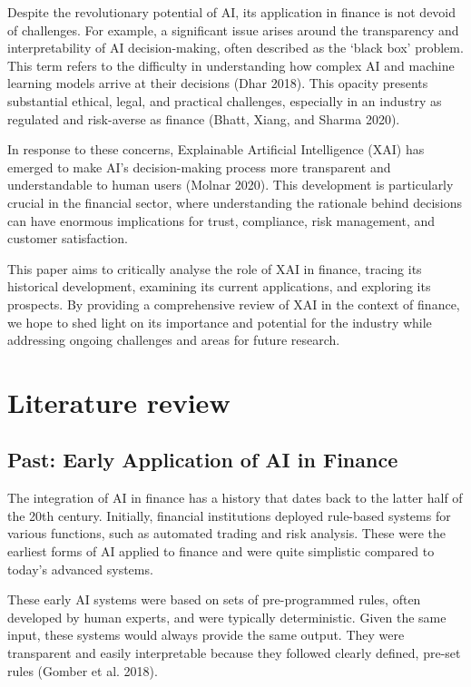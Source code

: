 \documentclass[
  letterpaper,
  DIV=11,
  numbers=noendperiod]{scrartcl}
\begin{document}
Despite the revolutionary potential of AI, its application in finance is
not devoid of challenges. For example, a significant issue arises around
the transparency and interpretability of AI decision-making, often
described as the `black box' problem. This term refers to the difficulty
in understanding how complex AI and machine learning models arrive at
their decisions (Dhar 2018). This opacity presents substantial ethical,
legal, and practical challenges, especially in an industry as regulated
and risk-averse as finance (Bhatt, Xiang, and Sharma 2020).

In response to these concerns, Explainable Artificial Intelligence (XAI)
has emerged to make AI's decision-making process more transparent and
understandable to human users (Molnar 2020). This development is
particularly crucial in the financial sector, where understanding the
rationale behind decisions can have enormous implications for trust,
compliance, risk management, and customer satisfaction.

This paper aims to critically analyse the role of XAI in finance,
tracing its historical development, examining its current applications,
and exploring its prospects. By providing a comprehensive review of XAI
in the context of finance, we hope to shed light on its importance and
potential for the industry while addressing ongoing challenges and areas
for future research.

\hypertarget{literature-review}{%
\section{Literature review}\label{literature-review}}

\hypertarget{past-early-application-of-ai-in-finance}{%
\subsection{Past: Early Application of AI in
Finance}\label{past-early-application-of-ai-in-finance}}

The integration of AI in finance has a history that dates back to the
latter half of the 20th century. Initially, financial institutions
deployed rule-based systems for various functions, such as automated
trading and risk analysis. These were the earliest forms of AI applied
to finance and were quite simplistic compared to today's advanced
systems.

These early AI systems were based on sets of pre-programmed rules, often
developed by human experts, and were typically deterministic. Given the
same input, these systems would always provide the same output. They
were transparent and easily interpretable because they followed clearly
defined, pre-set rules (Gomber et al. 2018).
\end{document}
